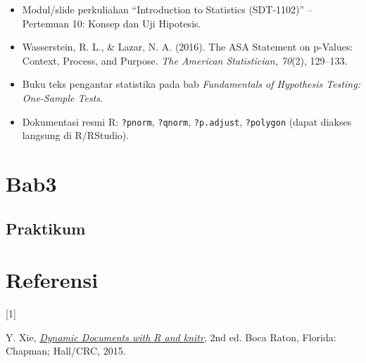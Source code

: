 \documentclass[
  indonesian,
  letterpaper,
]{book}
\newlength{\cslhangindent}
\newlength{\csllabelwidth}
\newenvironment{CSLReferences}[2] %
 {\begin{list}{}{%
  \setlength{\itemindent}{0pt}
  \setlength{\leftmargin}{0pt}
  \setlength{\parsep}{0pt}
  \ifodd #1
   \setlength{\leftmargin}{\cslhangindent}
   \setlength{\itemindent}{-1\cslhangindent}
  \fi
  \setlength{\itemsep}{#2\baselineskip}}}
 {\end{list}}
\newcommand{\CSLLeftMargin}[1]{\parbox[t]{\csllabelwidth}{\strut#1\strut}}
\newcommand{\CSLRightInline}[1]{\parbox[t]{\linewidth - \csllabelwidth}{\strut#1\strut}}
\providecommand{\tightlist}{%
  \setlength{\itemsep}{0pt}\setlength{\parskip}{0pt}}
\begin{document}
\begin{itemize}
\tightlist
\item
  Modul/slide perkuliahan ``Introduction to Statistics (SDT-1102)'' --
  Pertemuan 10: Konsep dan Uji Hipotesis.
\item
  Wasserstein, R. L., \& Lazar, N. A. (2016). The ASA Statement on
  p-Values: Context, Process, and Purpose. \emph{The American
  Statistician, 70}(2), 129--133.
\item
  Buku teks pengantar statistika pada bab \emph{Fundamentals of
  Hypothesis Testing: One-Sample Tests}.
\item
  Dokumentasi resmi R: \texttt{?pnorm}, \texttt{?qnorm},
  \texttt{?p.adjust}, \texttt{?polygon} (dapat diakses langsung di
  R/RStudio).
\end{itemize}


\chapter{Bab3}\label{bab3}

\section{Praktikum}\label{praktikum}


\chapter*{Referensi}\label{referensi}


\protect{}\label{refs}
\begin{CSLReferences}{0}{0}
\CSLLeftMargin{{[}1{]} }%
\CSLRightInline{Y. Xie, \emph{\href{http://yihui.name/knitr/}{Dynamic
Documents with {R} and knitr}}, 2nd ed. Boca Raton, Florida: Chapman;
Hall/CRC, 2015.}

\end{CSLReferences}


\backmatter
\end{document}
